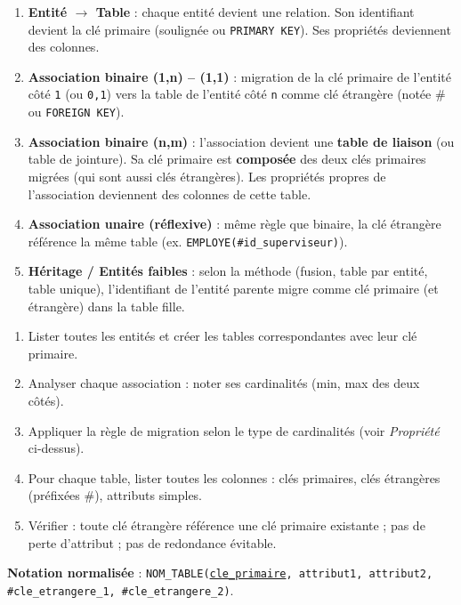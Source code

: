 \documentclass[11pt]{article}
\newcommand{\cle}[1]{{\popxbold\color{popdark}#1}}
\begin{document}
\begin{propriete}
\begin{enumerate}
\item \textbf{Entité $\to$ Table} : chaque entité devient une relation. Son identifiant devient la \cle{clé primaire} (soulignée ou \texttt{PRIMARY KEY}). Ses propriétés deviennent des colonnes.
\item \textbf{Association binaire (1,n) -- (1,1)} : migration de la clé primaire de l'entité côté \texttt{1} (ou \texttt{0,1}) vers la table de l'entité côté \texttt{n} comme \cle{clé étrangère} (notée \# ou \texttt{FOREIGN KEY}).
\item \textbf{Association binaire (n,m)} : l'association devient une \textbf{table de liaison} (ou table de jointure). Sa clé primaire est \textbf{composée} des deux clés primaires migrées (qui sont aussi clés étrangères). Les propriétés propres de l'association deviennent des colonnes de cette table.
\item \textbf{Association unaire (réflexive)} : même règle que binaire, la clé étrangère référence la même table (ex. \texttt{EMPLOYE(\#id\_superviseur)}).
\item \textbf{Héritage / Entités faibles} : selon la méthode (fusion, table par entité, table unique), l'identifiant de l'entité parente migre comme clé primaire (et étrangère) dans la table fille.
\end{enumerate}
\end{propriete}

\begin{methode}
\begin{enumerate}
\item Lister toutes les entités et créer les tables correspondantes avec leur clé primaire.
\item Analyser chaque association : noter ses cardinalités (min, max des deux côtés).
\item Appliquer la règle de migration selon le type de cardinalités (voir \emph{Propriété} ci-dessus).
\item Pour chaque table, lister toutes les colonnes : clés primaires, clés étrangères (préfixées \#), attributs simples.
\item Vérifier : toute clé étrangère référence une clé primaire existante ; pas de perte d'attribut ; pas de redondance évitable.
\end{enumerate}
\textbf{Notation normalisée} : \texttt{NOM\_TABLE(\underline{cle\_primaire}, attribut1, attribut2, \#cle\_etrangere\_1, \#cle\_etrangere\_2)}.
\end{methode}
\end{document}
